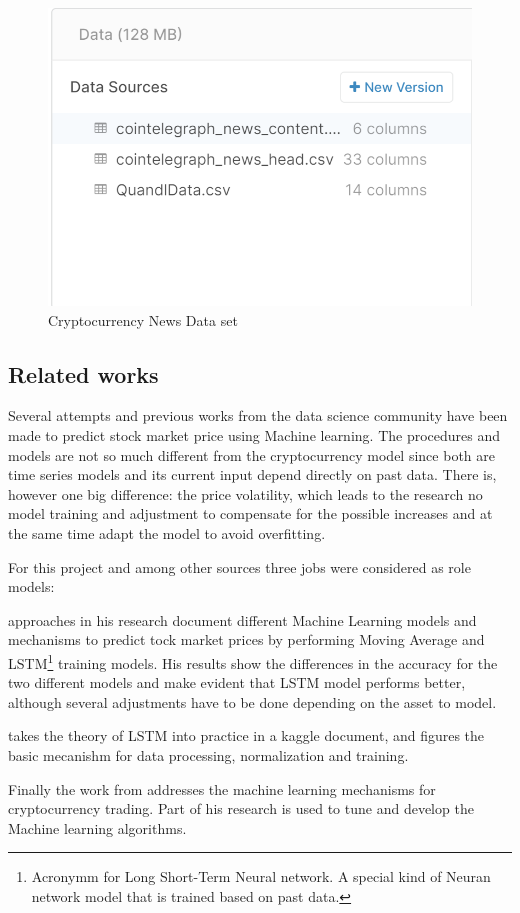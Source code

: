 \begin{figure}[h]
   \centering
   \includegraphics[width=\linewidth]{fig/CryptocurrencyNewsDataSet.png}
    \caption{Cryptocurrency News Data set \cite{cantu_cryptocurency_2020}}
    \label{fig:CryptoCurrencyNewsDataset}
\end{figure}


\subsection{Related works}
Several attempts and previous works from the data science community have been made to predict stock market price using Machine learning. The procedures and models are not so much different from the cryptocurrency model since both are time series models and its current input depend directly on past data. There is, however one big difference: the price volatility, which leads to the research no model training and adjustment to compensate for the possible increases and at the same time adapt the model to avoid overfitting.

For this project and among other sources three jobs were considered as role models:

\citeauthor{xavier_predicting_2019} approaches in his research document different Machine Learning models and mechanisms to predict tock market prices by performing Moving Average and LSTM\footnote{Acronymm for Long Short-Term Neural network. A special kind of Neuran network model that is trained based on past data.} training models. His results show the differences in the accuracy for the two different models and make evident that LSTM model performs better, although several adjustments have to be done depending on the asset to model.  \cite{adusumilli_predicting_2020} 

\citeauthor{pablo_castilla_predict_2018} takes the theory of LSTM into practice in a kaggle document, and figures the basic mecanishm for data processing, normalization and training\cite{pablo_castilla_predict_2018}.

Finally the work from \citeauthor{sagar_cryptocurrency_2019} addresses the machine learning mechanisms for cryptocurrency trading. Part of his research is used to tune and develop the Machine learning algorithms.





